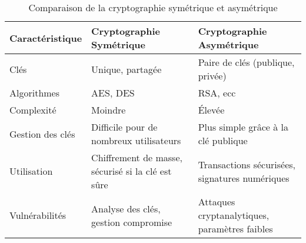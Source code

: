 \begin{table}[htbp]
    \centering
    \begin{tabularx}{\textwidth}{
        >{\raggedright\arraybackslash}p{2cm} 
        >{\raggedright\arraybackslash}X 
        >{\raggedright\arraybackslash}X}
        \toprule
        \rowcolor[HTML]{EFEFEF}
        \textbf{Caractéristique} & \textbf{Cryptographie Symétrique} & \textbf{Cryptographie Asymétrique} \\
        \midrule
        Clés & Unique, partagée & Paire de clés (publique, privée) \\
        \midrule
        Algorithmes & AES, DES & RSA, \acrshort{ecc} \\
        \midrule
        Complexité & Moindre & Élevée \\
        \midrule
        Gestion des clés & Difficile pour de nombreux utilisateurs & Plus simple grâce à la clé publique \\
        \midrule
        Utilisation & Chiffrement de masse, sécurisé si la clé est sûre & Transactions sécurisées, signatures numériques \\
        \midrule
        Vulnérabilités & Analyse des clés, gestion compromise & Attaques cryptanalytiques, paramètres faibles \\
        \bottomrule
    \end{tabularx}
    \caption{Comparaison de la cryptographie symétrique et asymétrique}
    \label{tab:tech-crypto}
\end{table}
    
    